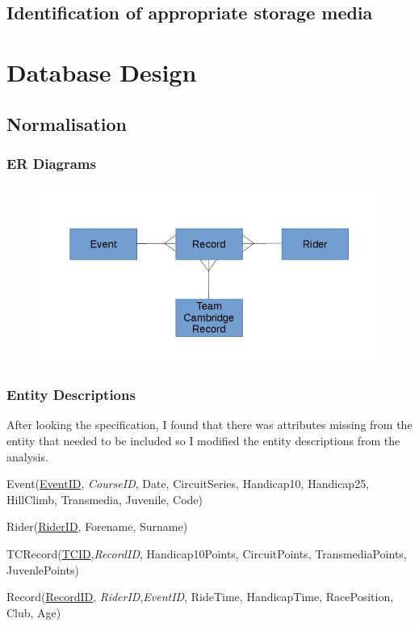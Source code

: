 \subsection{Identification of appropriate storage media}

\section{Database Design}

\subsection{Normalisation}

\subsubsection{ER Diagrams}
\begin{figure}[H]
    \includegraphics[width=\textwidth]{./ER/ERDesing.jpg}
\end{figure}

\subsubsection{Entity Descriptions}
After looking the specification, I found that there was attributes missing from the entity that needed to be included so I modified the entity descriptions from the analysis.

Event(\underline{EventID}, \emph{CourseID}, Date, CircuitSeries, Handicap10, Handicap25, HillClimb, Transmedia, Juvenile, Code)

Rider(\underline{RiderID}, Forename, Surname)

TCRecord(\underline{TCID},\emph{RecordID}, Handicap10Points, CircuitPoints, TransmediaPoints, JuvenlePoints)

Record(\underline{RecordID}, \emph{RiderID},\emph{EventID}, RideTime, HandicapTime, RacePosition, Club, Age)


